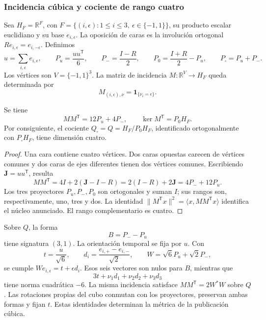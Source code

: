 \subsubsection{Incidencia cúbica y cociente de rango cuatro}
\label{ii:vii:sec:cociente-pantalla}

Sea \(H_F=\mathbb R^F\), con
\(F=\{(i,\epsilon):1\leq i\leq3,\ \epsilon\in\{-1,1\}\}\),
su producto escalar euclidiano y su base \(e_{i,\epsilon}\).
La oposición de caras es la involución ortogonal
\(Re_{i,\epsilon}=e_{i,-\epsilon}\). Definimos
\[
 u=\sum_{i,\epsilon}e_{i,\epsilon},\qquad
 P_u=\frac{uu^{\mathsf T}}6,\qquad P_-=\frac{I-R}{2},\qquad
 P_0=\frac{I+R}{2}-P_u,\qquad P_\square=P_u+P_-.
\]
Los vértices son \(V=\{-1,1\}^3\). La matriz de incidencia
\(M:\mathbb R^V\longrightarrow H_F\) queda determinada por
\[
 M_{(i,\epsilon),\nu}=\mathbf1_{\{\nu_i=\epsilon\}}.
\]

\begin{proposition}
\label{ii:vii:prop:incidencia}
Se tiene
\[
 MM^{\mathsf T}=12P_u+4P_-,
 \qquad
 \ker M^{\mathsf T}=P_0H_F.
\]
Por consiguiente, el cociente
\(Q_\square=Q=H_F/P_0H_F\), identificado ortogonalmente con
\(P_\square H_F\), tiene dimensión cuatro.
\end{proposition}

\begin{proof}
Una cara contiene cuatro vértices. Dos caras opuestas carecen de vértices
comunes y dos caras de ejes diferentes tienen dos vértices comunes.
Escribiendo \(\mathbf J=uu^{\mathsf T}\), resulta
\[
 MM^{\mathsf T}=4I+2(\mathbf J-I-R)
 =2(I-R)+2\mathbf J=4P_-+12P_u.
\]
Los tres proyectores \(P_u,P_-,P_0\) son ortogonales y suman \(I\);
sus rangos son, respectivamente, uno, tres y dos. La identidad
\(\|M^{\mathsf T}x\|^2=\langle x,MM^{\mathsf T}x\rangle\)
identifica el núcleo anunciado. El rango complementario es cuatro.
\end{proof}

Sobre \(Q\), la forma
\[
 B=P_--P_u
\]
tiene signatura \((3,1)\). La orientación temporal se fija por \(u\).
Con
\[
 t=\frac{u}{\sqrt6},\qquad
 d_i=\frac{e_{i,+}-e_{i,-}}{\sqrt2},\qquad
 W=\sqrt6P_u+\sqrt2P_-,
\]
se cumple \(We_{i,\epsilon}=t+\epsilon d_i\). Esos seis vectores
son nulos para \(B\), mientras que
\[
 3t+\nu_1d_1+\nu_2d_2+\nu_3d_3
\]
tiene norma cuadrática \(-6\). La misma incidencia satisface
\(MM^{\mathsf T}=2W^*W\) sobre \(Q\). Las rotaciones propias del cubo
conmutan con los proyectores, preservan ambas formas y fijan \(t\).
Estas identidades determinan la métrica de la publicación cúbica.

